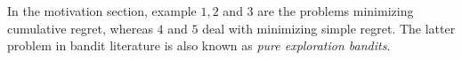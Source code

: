 In the motivation section, example $1,2$ and $3$ are the problems minimizing cumulative regret, whereas $4$ and $5$ deal with minimizing simple regret. The latter problem in bandit literature is also known as \textit{pure exploration bandits}. 

                                                                                                                                         
